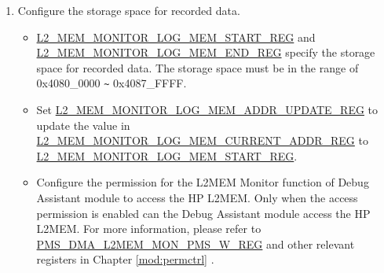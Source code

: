 \documentclass[main\_\_EN.tex]{subfiles}
\begin{document}
\begin{enumerate}
\item Configure the storage space for recorded data.
        \begin{itemize}
            \item \hyperref[regdesc:L2MEMMONITORLOGMEMSTARTREG]{L2\_MEM\_MONITOR\_LOG\_MEM\_START\_REG} and \hyperref[regdesc:L2MEMMONITORLOGMEMENDREG]{L2\_MEM\_MONITOR\_LOG\_MEM\_END\_REG} specify the storage space for recorded data. The storage space must be in the range of 0x4080\_0000 \verb+~+ 0x4087\_FFFF.
            \item Set \hyperref[regdesc:L2MEMMONITORLOGMEMADDRUPDATEREG]{L2\_MEM\_MONITOR\_LOG\_MEM\_ADDR\_UPDATE\_REG} to update the value in \hyperref[regdesc:L2MEMMONITORLOGMEMCURRENTADDRREG]{L2\_MEM\_MONITOR\_LOG\_MEM\_CURRENT\_ADDR\_REG} to \hyperref[regdesc:L2MEMMONITORLOGMEMSTARTREG]{L2\_MEM\_MONITOR\_LOG\_MEM\_START\_REG}.
            \item Configure the permission for the L2MEM Monitor function of Debug Assistant module to access the HP L2MEM. Only when the access permission is enabled can the Debug Assistant module access the HP L2MEM. For more information, please refer to \hyperref[regdesc:PMSDMAL2MEMMONPMSWREG]{PMS\_DMA\_L2MEM\_MON\_PMS\_W\_REG} and other relevant registers in Chapter \ref{mod:permctrl} \textit{}.
        \end{itemize}


\end{enumerate}
\end{document}

